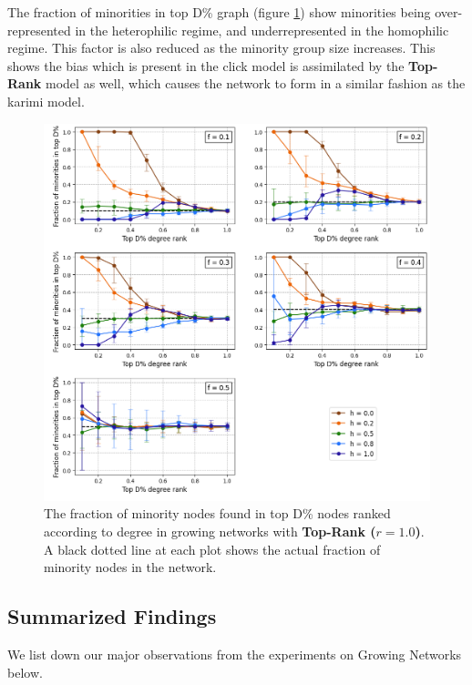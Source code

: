 The fraction of minorities in top D\% graph (figure \ref{top_growth_top10_fig}) show minorities being over-represented in the heterophilic regime, and underrepresented in the homophilic regime. This factor is also reduced as the minority group size increases. This shows the bias which is present in the click model is assimilated by the \textbf{Top-Rank} model as well, which causes the network to form in a similar fashion as the karimi model. 

\begin{figure}[h!]
	\centering
	\includegraphics[trim=0 10 0 5, clip, width=1.0\textwidth]{images/top_growth_top10.png}
	\caption{The fraction of minority nodes found in top D\% nodes ranked according to degree in growing networks with \textbf{Top-Rank ($r = 1.0$)}. A black dotted line at each plot shows the actual fraction of minority nodes in the network.}
	\label{top_growth_top10_fig}
\end{figure}

\subsection{Summarized Findings}

We list down our major observations from the experiments on Growing Networks below.

